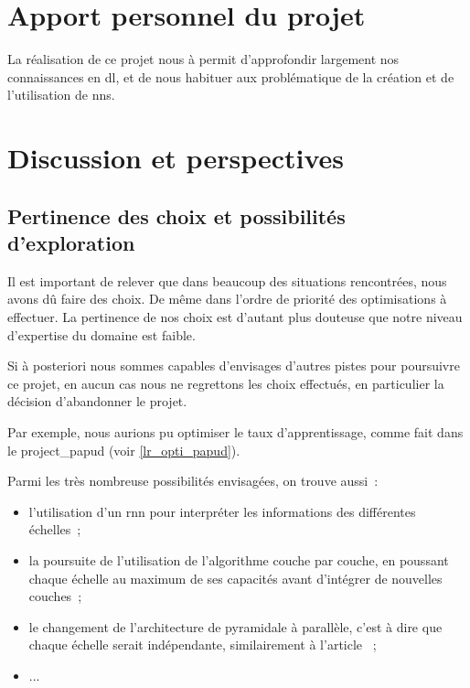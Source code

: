 \section{Apport personnel du projet}
La réalisation de ce projet nous à permit d'approfondir largement nos connaissances en \gls{dl}, et de nous habituer aux problématique de la création et de l'utilisation de \glspl{nn}.

\section{Discussion et perspectives}
\subsection{Pertinence des choix et possibilités d'exploration}
Il est important de relever que dans beaucoup des situations rencontrées, nous avons dû faire des choix. De même dans l'ordre de priorité des optimisations à effectuer. La pertinence de nos choix est d'autant plus douteuse que notre niveau d'expertise du domaine est faible.

Si à posteriori nous sommes capables d'envisages d'autres pistes pour poursuivre ce projet, en aucun cas nous ne regrettons les choix effectués, en particulier la décision d'abandonner le projet. %

Par exemple, nous aurions pu optimiser le taux d'apprentissage, comme fait dans le \gls{project_papud} (voir \autoref{lr_opti_papud}).

Parmi les très nombreuse possibilités envisagées, on trouve aussi~:
\begin{itemize}
	\item l'utilisation d'un \gls{rnn} pour interpréter les informations des différentes échelles~;
	\item la poursuite de l'utilisation de l'algorithme couche par couche, en poussant chaque échelle au maximum de ses capacités avant d'intégrer de nouvelles couches~;
	\item le changement de l'architecture de pyramidale à parallèle, c'est à dire que chaque échelle serait indépendante, similairement à l'article \autocite{}~;
	
	\item ...
\end{itemize}

